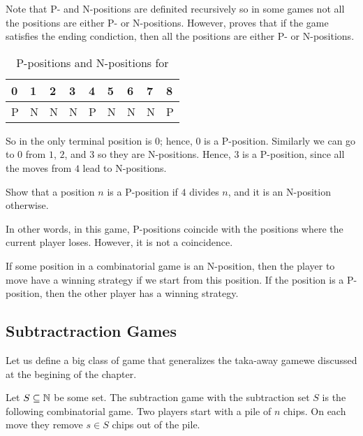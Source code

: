 Note that P- and N-positions are definited recursively so in some games not all
the positions are either P- or N-positions. However, 
proves that if the game satisfies the ending condiction, then all the positions
are either P- or N-positions.


\begin{table}[h!]
  \centering
  \begin{tabular}{l l l l l l l l l}
      \toprule
      0 & 1 & 2 & 3 & 4 & 5 & 6 & 7 & 8 \\
      \midrule
      P & N & N & N & P & N & N & N & P \\
      \bottomrule
  \end{tabular}
  \caption{P-positions and N-positions for }
  \label{table:take-away-21-3-2-1}
\end{table}


So in  the only terminal position is $0$;
hence, $0$ is a P-position. Similarly we can go to $0$ from $1$, $2$, and
$3$ so they are N-positions. Hence, $3$ is a P-position,
since all the moves from $4$ lead to N-positions.
\begin{exercise}
  Show that a position $n$ is a P-position if $4$ divides $n$, and
  it is an N-position otherwise.
\end{exercise}

In other words, in this game, P-positions coincide with the positions where the
current player loses. However, it is not a coincidence.
\begin{theorem}
  If some position in a combinatorial game is an N-position, then the player to
  move have a winning strategy if we start from this position. If the position
  is a P-position, then the other player has a winning strategy.
\end{theorem}

\subsection{Subtractraction Games}
Let us define a big class of game that generalizes the taka-away gamewe
discussed at the begining of the chapter.
\begin{game}
  Let $S \subseteq {\mathbb{N}}$ be some set. The subtraction game with the subtraction
  set $S$ is the following combinatorial game.
  Two players start with a pile of $n$ chips.
  On each move they remove $s \in S$ chips out of the pile.
\end{game}

